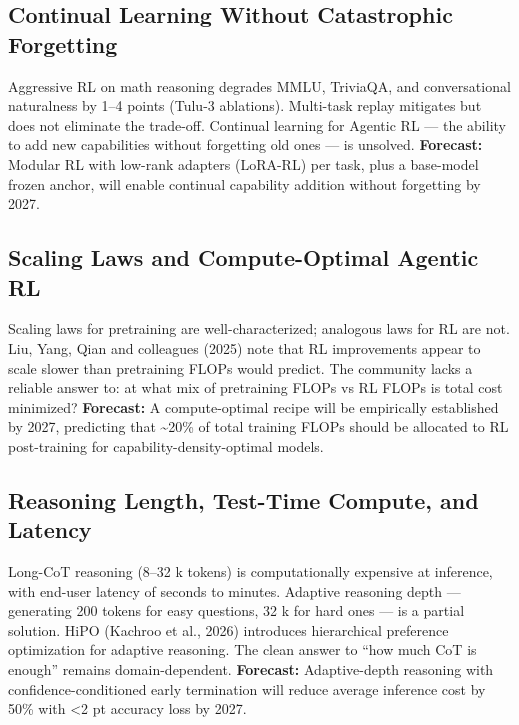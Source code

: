 \subsection{Continual Learning Without Catastrophic Forgetting}\label{continual-learning-without-catastrophic-forgetting}

Aggressive RL on math reasoning degrades MMLU, TriviaQA, and conversational naturalness by 1--4 points (Tulu-3 ablations). Multi-task replay mitigates but does not eliminate the trade-off. Continual learning for Agentic RL --- the ability to add new capabilities without forgetting old ones --- is unsolved. \textbf{Forecast:} Modular RL with low-rank adapters (LoRA-RL) per task, plus a base-model frozen anchor, will enable continual capability addition without forgetting by 2027.

\subsection{Scaling Laws and Compute-Optimal Agentic RL}\label{scaling-laws-and-compute-optimal-agentic-rl}

Scaling laws for pretraining are well-characterized; analogous laws for RL are not. Liu, Yang, Qian and colleagues (2025) note that RL improvements appear to scale slower than pretraining FLOPs would predict. The community lacks a reliable answer to: at what mix of pretraining FLOPs vs RL FLOPs is total cost minimized? \textbf{Forecast:} A compute-optimal recipe will be empirically established by 2027, predicting that \textasciitilde20\% of total training FLOPs should be allocated to RL post-training for capability-density-optimal models.

\subsection{Reasoning Length, Test-Time Compute, and Latency}\label{reasoning-length-test-time-compute-and-latency}

Long-CoT reasoning (8--32 k tokens) is computationally expensive at inference, with end-user latency of seconds to minutes. Adaptive reasoning depth --- generating 200 tokens for easy questions, 32 k for hard ones --- is a partial solution. HiPO (Kachroo et al., 2026) introduces hierarchical preference optimization for adaptive reasoning. The clean answer to ``how much CoT is enough'' remains domain-dependent. \textbf{Forecast:} Adaptive-depth reasoning with confidence-conditioned early termination will reduce average inference cost by 50\% with \textless2 pt accuracy loss by 2027.

